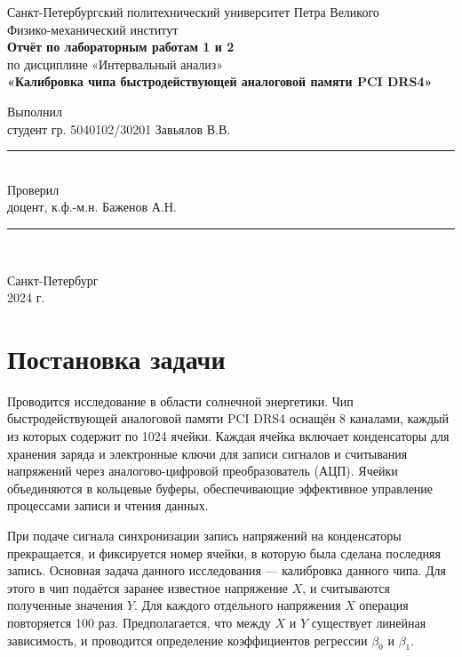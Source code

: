 \documentclass[a4paper,14pt]{extarticle}
\begin{document}
\begin{titlepage}
    \begin{center}
        Санкт-Петербургский политехнический университет Петра Великого\\
        Физико-механический институт\\[4cm]
        
        \textbf{Отчёт по лабораторным работам 1 и 2}\\[0.5cm]
        по дисциплине «Интервальный анализ»\\[0.5cm]
        \textbf{«Калибровка чипа быстродействующей аналоговой памяти PCI DRS4»}\\[4cm]

        
        \begin{flushleft}
            Выполнил\\
            студент гр. 5040102/30201 \hfill Завьялов В.В. \hfill \rule{3cm}{0.1pt} \\[1.5cm]
            Проверил\\
            доцент, к.ф.-м.н. \hfill \hspace{1.9cm} Баженов А.Н. \hfill \rule{3cm}{0.1pt} \\[1.5cm]
        \end{flushleft}
        
        \vfill
        Санкт-Петербург\\
        2024 г.
    \end{center}
\end{titlepage}

\newpage

\tableofcontents

\newpage
\section{Постановка задачи}

Проводится исследование в области солнечной энергетики. Чип быстродействующей аналоговой памяти PCI DRS4 оснащён 8 каналами, каждый из которых содержит по 1024 ячейки. Каждая ячейка включает конденсаторы для хранения заряда и электронные ключи для записи сигналов и считывания напряжений через аналогово-цифровой преобразователь (АЦП). Ячейки объединяются в кольцевые буферы, обеспечивающие эффективное управление процессами записи и чтения данных.

При подаче сигнала синхронизации запись напряжений на конденсаторы прекращается, и фиксируется номер ячейки, в которую была сделана последняя запись. Основная задача данного исследования — калибровка данного чипа. Для этого в чип подаётся заранее известное напряжение $ X $, и считываются полученные значения $ Y $. Для каждого отдельного напряжения $ X $ операция повторяется 100 раз. Предполагается, что между $ X $ и $ Y $ существует линейная зависимость, и проводится определение коэффициентов регрессии $ \beta_0 $ и $ \beta_1 $.
\end{document}
